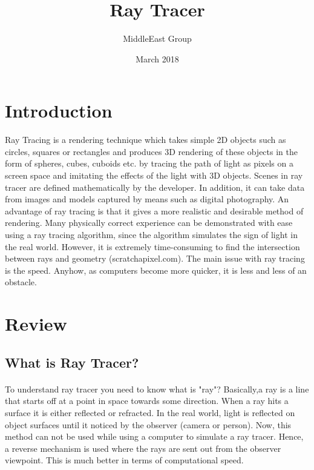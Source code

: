 \documentclass{article}
\title{Ray Tracer}
\author{MiddleEast Group }
\date{March 2018}
\begin{document}
\maketitle 

\section{Introduction}

Ray Tracing is a rendering technique which takes simple 2D objects such as circles, squares or rectangles and
produces 3D rendering of these objects in the form of spheres, cubes, cuboids etc.  by tracing the path of light as pixels on a screen space and imitating the effects of the light  with 3D objects. Scenes in ray tracer are defined mathematically by the developer. In addition, it can take data from images and models captured by means such as digital photography. \newline An advantage of ray tracing is that it gives a more realistic and desirable method of rendering. Many physically correct experience can be demonstrated with ease using a ray tracing algorithm, since the algorithm simulates the sign of light in the real world.
However, it is extremely time-consuming to find the intersection between rays and geometry (scratchapixel.com). The main issue with ray tracing is the speed. Anyhow, as computers become more quicker, it is less and less of an obstacle. 

\section{Review}
\subsection{What is Ray Tracer?}

\paragraph{}
To understand ray tracer you need to know what is "ray"? Basically,a ray is a line that starts off at a point in space towards some direction. When a ray hits a surface it is either reflected or refracted.
In the real world, light is reflected on object surfaces until it noticed by the observer (camera or person). \newline Now, this method can not be used while using a computer to simulate a ray tracer. Hence, a reverse mechanism is used where the rays are sent out from the observer viewpoint. This is much better in terms of computational speed. 
\end{document}
